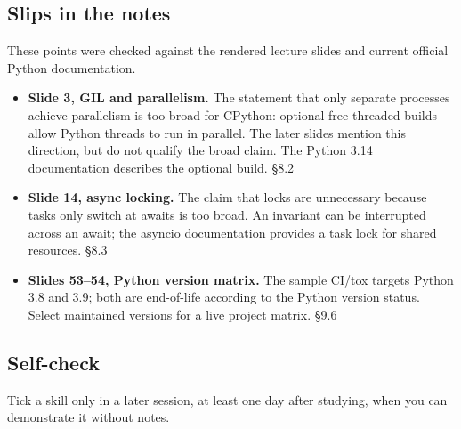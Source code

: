 \documentclass[11pt]{article}
\begin{document}
\begin{keepsection}
\begin{keepsection}
\section{Slips in the notes}

These points were checked against the rendered lecture slides and current official Python documentation.

\begin{itemize}
\item \textbf{Slide 3, GIL and parallelism.} The statement that only separate processes achieve parallelism is too broad for CPython: optional free-threaded builds allow Python threads to run in parallel. The later slides mention this direction, but do not qualify the broad claim. The Python 3.14 documentation describes the optional build. \hfill{\small\color{FAUblue}§8.2}
\item \textbf{Slide 14, async locking.} The claim that locks are unnecessary because tasks only switch at awaits is too broad. An invariant can be interrupted across an await; the asyncio documentation provides a task lock for shared resources. \hfill{\small\color{FAUblue}§8.3}
\item \textbf{Slides 53–54, Python version matrix.} The sample CI/tox targets Python 3.8 and 3.9; both are end-of-life according to the Python version status. Select maintained versions for a live project matrix. \hfill{\small\color{FAUblue}§9.6}
\end{itemize}
\end{keepsection}

\begin{keepsection}
\section{Self-check}

Tick a skill only in a later session, at least one day after studying, when you can demonstrate it without notes.


\end{keepsection}
\end{keepsection}
\end{document}
